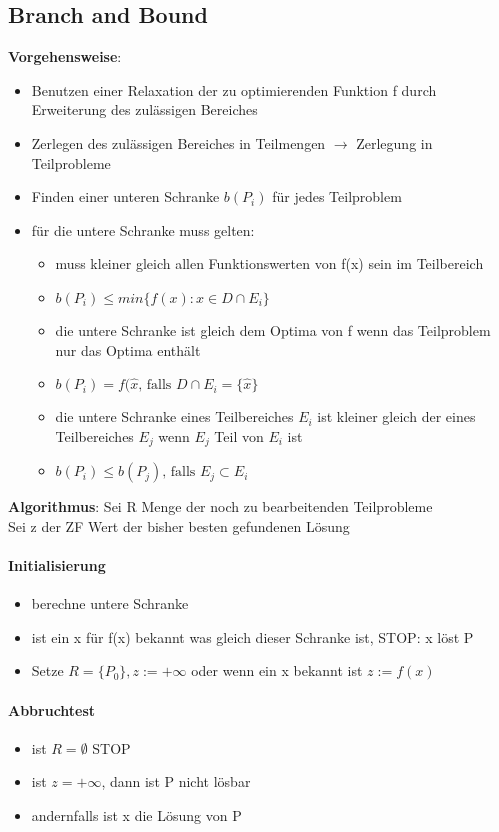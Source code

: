 \documentclass[12pt,a4paper, hyperref]{article}
\begin{document}
\subsection{Branch and Bound}
\textbf{Vorgehensweise}:
\begin{itemize}
\item Benutzen einer Relaxation der zu optimierenden Funktion f durch Erweiterung des zulässigen Bereiches
\item Zerlegen des zulässigen Bereiches in Teilmengen $\rightarrow$ Zerlegung in Teilprobleme
\item Finden einer unteren Schranke $b(P_i)$ für jedes Teilproblem
\item für die untere Schranke muss gelten:
\begin{itemize}
\item muss kleiner gleich allen Funktionswerten von f(x) sein im Teilbereich
\item $b(P_i) \leq min\{f(x): x\in D \cap E_i \}$
\item die untere Schranke ist gleich dem Optima von f wenn das Teilproblem nur das Optima enthält
\item $b(P_i) = f(\hat{x}\text{, falls } D \cap E_i = \{\hat{x}\}$
\item die untere Schranke eines Teilbereiches $E_i$ ist kleiner gleich der eines Teilbereiches $E_j$ wenn $E_j$ Teil von $E_i$ ist
\item $b(P_i) \leq b(P_j)\text{, falls } E_j \subset E_i$
\end{itemize}
\end{itemize}
\textbf{Algorithmus}:
\flushleft Sei R Menge der noch zu bearbeitenden Teilprobleme\\
Sei z der ZF Wert der bisher besten gefundenen Lösung
\paragraph{Initialisierung}
\begin{itemize}
\item berechne untere Schranke
\item ist ein x für f(x) bekannt was gleich dieser Schranke ist, STOP: x löst P
\item Setze $R=\{P_0\}, z:=+\infty$ oder wenn ein x bekannt ist $z:=f(x)$
\end{itemize}
\paragraph{Abbruchtest}
\begin{itemize}
\item ist $R=\emptyset$ STOP
\item ist $z=+\infty$, dann ist P nicht lösbar
\item andernfalls ist x die Lösung von P
\end{itemize}
\end{document}
